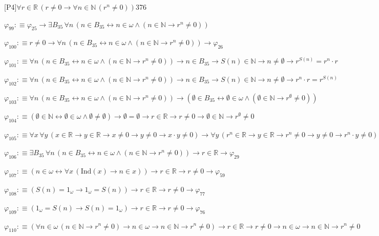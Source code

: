 \begin{fullproof}{[P4]}{$\forall r \in \mathbb{R}\,(r \neq 0 \to \forall n \in \mathbb{N}\,({{r}^{n}} \neq 0))$}{376}
\begin{abbrevlist}
\item $\varphi_{99} :\equiv \varphi_{25} \to \exists B_{35}\,\forall n\,(n \in B_{35} \leftrightarrow n \in \omega \land (n \in \mathbb{N} \to {{r}^{n}} \neq 0))$
\item $\varphi_{100} :\equiv r \neq 0 \to \forall n\,(n \in B_{35} \leftrightarrow n \in \omega \land (n \in \mathbb{N} \to {{r}^{n}} \neq 0)) \to \varphi_{26}$
\item $\varphi_{101} :\equiv \forall n\,(n \in B_{35} \leftrightarrow n \in \omega \land (n \in \mathbb{N} \to {{r}^{n}} \neq 0)) \to n \in B_{35} \to S(n) \in \mathbb{N} \to n \neq \emptyset \to {{r}^{S(n)}} = {{r}^{n}} \cdot r$
\item $\varphi_{102} :\equiv \forall n\,(n \in B_{35} \leftrightarrow n \in \omega \land (n \in \mathbb{N} \to {{r}^{n}} \neq 0)) \to n \in B_{35} \to S(n) \in \mathbb{N} \to n \neq \emptyset \to {{r}^{n}} \cdot r = {{r}^{S(n)}}$
\item $\varphi_{103} :\equiv \forall n\,(n \in B_{35} \leftrightarrow n \in \omega \land (n \in \mathbb{N} \to {{r}^{n}} \neq 0)) \to (\emptyset \in B_{35} \leftrightarrow \emptyset \in \omega \land (\emptyset \in \mathbb{N} \to {{r}^{\emptyset}} \neq 0))$
\item $\varphi_{104} :\equiv (\emptyset \in \mathbb{N} \leftrightarrow \emptyset \in \omega \land \emptyset \neq \emptyset) \to \emptyset = \emptyset \to r \in \mathbb{R} \to r \neq 0 \to \emptyset \in \mathbb{N} \to {{r}^{\emptyset}} \neq 0$
\item $\varphi_{105} :\equiv \forall x\,\forall y\,(x \in \mathbb{R} \to y \in \mathbb{R} \to x \neq 0 \to y \neq 0 \to x \cdot y \neq 0) \to \forall y\,({{r}^{n}} \in \mathbb{R} \to y \in \mathbb{R} \to {{r}^{n}} \neq 0 \to y \neq 0 \to {{r}^{n}} \cdot y \neq 0)$
\item $\varphi_{106} :\equiv \exists B_{35}\,\forall n\,(n \in B_{35} \leftrightarrow n \in \omega \land (n \in \mathbb{N} \to {{r}^{n}} \neq 0)) \to r \in \mathbb{R} \to \varphi_{29}$
\item $\varphi_{107} :\equiv (n \in \omega \leftrightarrow \forall x\,(\mathrm{Ind}(x) \to n \in x)) \to r \in \mathbb{R} \to r \neq 0 \to \varphi_{59}$
\item $\varphi_{108} :\equiv (S(n) = 1_{\omega} \to 1_{\omega} = S(n)) \to r \in \mathbb{R} \to r \neq 0 \to \varphi_{77}$
\item $\varphi_{109} :\equiv (1_{\omega} = S(n) \to S(n) = 1_{\omega}) \to r \in \mathbb{R} \to r \neq 0 \to \varphi_{76}$
\item $\varphi_{110} :\equiv (\forall n \in \omega\,(n \in \mathbb{N} \to {{r}^{n}} \neq 0) \to n \in \omega \to n \in \mathbb{N} \to {{r}^{n}} \neq 0) \to r \in \mathbb{R} \to r \neq 0 \to n \in \omega \to n \in \mathbb{N} \to {{r}^{n}} \neq 0$

\end{abbrevlist}
\end{fullproof}
